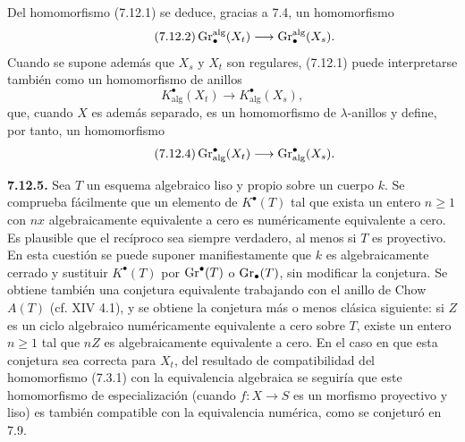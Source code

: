 Del homomorfismo (7.12.1) se deduce, gracias a 7.4, un homomorfismo
\begin{equation}\tag{7.12.2}
  \operatorname{Gr}_\bullet^{\mathrm{alg}}(X_t)\longrightarrow \operatorname{Gr}_\bullet^{\mathrm{alg}}(X_s).
\end{equation}
Cuando se supone además que \(X_s\) y \(X_t\) son regulares, (7.12.1) puede interpretarse también como un homomorfismo de anillos
\begin{equation}\tag{7.12.3}
  K^\bullet_{\mathrm{alg}}(X_t)\longrightarrow K^\bullet_{\mathrm{alg}}(X_s),
\end{equation}
que, cuando \(X\) es además separado, es un homomorfismo de \(\lambda\)-anillos y define, por tanto, un homomorfismo
\begin{equation}\tag{7.12.4}
  \operatorname{Gr}^\bullet_{\mathrm{alg}}(X_t)\longrightarrow \operatorname{Gr}^\bullet_{\mathrm{alg}}(X_s).
\end{equation}

\textbf{7.12.5.} Sea \(T\) un esquema algebraico liso y propio sobre un cuerpo \(k\). Se comprueba fácilmente que un elemento de \(K^\bullet(T)\) tal que exista un entero \(n\geq1\) con \(nx\) algebraicamente equivalente a cero es numéricamente equivalente a cero. Es plausible que el recíproco sea siempre verdadero, al menos si \(T\) es proyectivo. En esta cuestión se puede suponer manifiestamente que \(k\) es algebraicamente cerrado y sustituir \(K^\bullet(T)\) por \(\operatorname{Gr}^\bullet(T)\) o \(\operatorname{Gr}_\bullet(T)\), sin modificar la conjetura. Se obtiene también una conjetura equivalente trabajando con el anillo de Chow \(A(T)\) (cf. XIV 4.1), y se obtiene la conjetura más o menos clásica siguiente: si \(Z\) es un ciclo algebraico numéricamente equivalente a cero sobre \(T\), existe un entero \(n\geq1\) tal que \(nZ\) es algebraicamente equivalente a cero. En el caso en que esta conjetura sea correcta para \(X_t\), del resultado de compatibilidad del homomorfismo (7.3.1) con la equivalencia algebraica se seguiría que este homomorfismo de especialización (cuando \(f:X\to S\) es un morfismo proyectivo y liso) es también compatible con la equivalencia numérica, como se conjeturó en 7.9.

